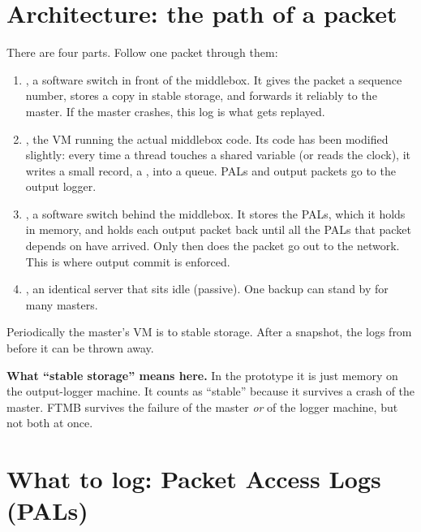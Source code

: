 \section{Architecture: the path of a packet}


There are four parts. Follow one packet through them:
\begin{enumerate}
  \item {}, a software switch in front of the middlebox. It gives the packet a sequence number, stores a copy in
        stable storage, and forwards it reliably to the master. If the master crashes, this log is what gets replayed.
  \item {}, the VM running the actual middlebox code. Its code has been modified slightly: every time a thread touches a
        shared variable (or reads the clock), it writes a small record, a , into a queue. PALs and output packets go to the
        output logger.
  \item {}, a software switch behind the middlebox. It stores the PALs, which it holds in memory, and holds
        each output packet back until all the PALs that packet depends on have arrived. Only then does the packet go out to the network.
        This is where output commit is enforced.
  \item {}, an identical server that sits idle (passive). One backup can stand by for many masters.
\end{enumerate}
Periodically the master's VM is  to stable storage. After a snapshot, the logs from before it can be thrown away.

\textbf{What ``stable storage'' means here.} In the prototype it is just memory on the output-logger machine. It counts as
``stable'' because it survives a crash of the master. FTMB survives the failure of the master \emph{or} of the logger machine, but
not both at once.

\section{What to log: Packet Access Logs (PALs)}\label{sec:ftmbpal}

